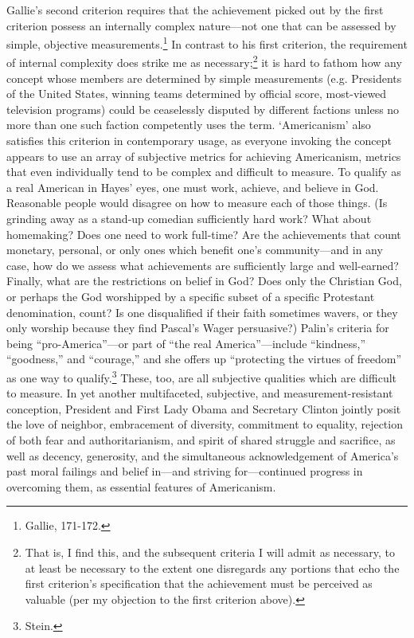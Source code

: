 Gallie's second criterion requires that the achievement picked out by
the first criterion possess an internally complex nature---not one that
can be assessed by simple, objective measurements.\footnote{Gallie,
  171-172.} In contrast to his first criterion, the requirement of
internal complexity does strike me as necessary;\footnote{That is, I
  find this, and the subsequent criteria I will admit as necessary, to
  at least be necessary to the extent one disregards any portions that
  echo the first criterion's specification that the achievement must be
  perceived as valuable (per my objection to the first criterion above).}
it is hard to fathom how any concept whose members are determined by
simple measurements (e.g. Presidents of the United States, winning teams
determined by official score, most-viewed television programs) could be
ceaselessly disputed by different factions unless no more than one such
faction competently uses the term. `Americanism' also satisfies this
criterion in contemporary usage, as everyone invoking the concept
appears to use an array of subjective metrics for achieving Americanism,
metrics that even individually tend to be complex and difficult to
measure. To qualify as a real American in Hayes' eyes, one must work,
achieve, and believe in God. Reasonable people would disagree on how to
measure each of those things. (Is grinding away as a stand-up comedian
sufficiently hard work? What about homemaking? Does one need to work
full-time? Are the achievements that count monetary, personal, or only
ones which benefit one's community---and in any case, how do we assess
what achievements are sufficiently large and well-earned? Finally, what
are the restrictions on belief in God? Does only the Christian God, or
perhaps the God worshipped by a specific subset of a specific Protestant
denomination, count? Is one disqualified if their faith sometimes
wavers, or they only worship because they find Pascal's Wager
persuasive?) Palin's criteria for being ``pro-America''---or part of
``the real America''---include ``kindness,'' ``goodness,'' and
``courage,'' and she offers up ``protecting the virtues of freedom'' as
one way to qualify.\footnote{Stein.} These, too, are all subjective
qualities which are difficult to measure. In yet another multifaceted,
subjective, and measurement-resistant conception, President and First
Lady Obama and Secretary Clinton jointly posit the love of neighbor,
embracement of diversity, commitment to equality, rejection of both fear
and authoritarianism, and spirit of shared struggle and sacrifice, as
well as decency, generosity, and the simultaneous acknowledgement of
America's past moral failings and belief in---and striving
for---continued progress in overcoming them, as essential features of
Americanism.

